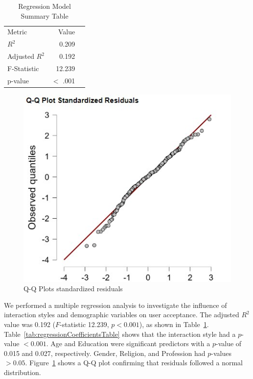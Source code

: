 \documentclass[conference]{IEEEtran}
\begin{document}
\begin{table}[H]
    \centering
    \caption{Regression Model Summary Table}
    \label{tab:regressionModelSummaryTable}
        \begin{tabular}{lrr}
            \toprule
            Metric & Value  \\
            \cmidrule[0.4pt]{1-2}
            $R^2$ & 0.209 \\
            Adjusted $R^2$  & 0.192 \\
            F-Statistic & 12.239 \\
            p-value & $<$ .001 \\
            \bottomrule
        \end{tabular}
\end{table}

\begin{figure}[ht]
    \centering
    \includegraphics[width=\linewidth]{images/Q-Q Plots for residuals.jpg}
    \caption{Q-Q Plots standardized residuals}
    \label{q_qplots}    
\end{figure}

We performed a multiple regression analysis to investigate the influence of interaction styles and demographic variables on user acceptance. The adjusted $R^2$ value was 0.192 ($F$-statistic 12.239, $p < 0.001$), as shown in Table~\ref{tab:regressionModelSummaryTable}. Table~\ref{tab:regressionCoefficientsTable} shows that the interaction style had a $p$-value $< 0.001$. Age and Education were significant predictors with a $p$-value of 0.015 and 0.027, respectively. Gender, Religion, and Profession had $p$-values $> 0.05$. Figure~\ref{q_qplots} shows a Q-Q plot confirming that residuals followed a normal distribution.
\end{document}
